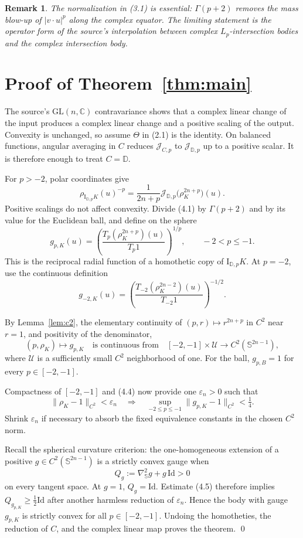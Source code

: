 \documentclass[11pt]{article}
\newtheorem{remark}[theorem]{Remark}
\newcommand{\C}{\mathbb C}
\newcommand{\D}{\mathbb D}
\newcommand{\Sph}{\mathbb S}
\newcommand{\J}{\mathcal J}
\newcommand{\Idp}{\mathrm I_{\D,p}}
\newcommand{\GL}{\mathrm{GL}}
\newcommand{\Gam}{\Gamma}
\begin{document}
\begin{remark}
The normalization in (3.1) is essential: $\Gam(p+2)$ removes the mass blow-up
of $|v\cdot u|^p$ along the complex equator.  The limiting statement is the
operator form of the source's interpolation between complex $L_p$-intersection
bodies and the complex intersection body.
\end{remark}

\section{Proof of Theorem~\ref{thm:main}}

The source's $\GL(n,\C)$ contravariance shows that a complex linear change of
the input produces a complex linear change and a positive scaling of the
output.  Convexity is unchanged, so assume $\Theta$ in (2.1) is the identity.
On balanced functions, angular averaging in $C$ reduces $\J_{C,p}$ to
$\J_{\D,p}$ up to a positive scalar.  It is therefore enough to treat $C=\D$.

For $p>-2$, polar coordinates give
\[
 \rho_{\Idp K}(u)^{-p}
 =\frac1{2n+p}\J_{\D,p}\bigl(\rho_K^{2n+p}\bigr)(u).              \tag{4.1}
\]
Positive scalings do not affect convexity.  Divide (4.1) by
$\Gam(p+2)$ and by its value for the Euclidean ball, and define on the sphere
\[
 g_{p,K}(u)=
 \left(
 \frac{T_p(\rho_K^{2n+p})(u)}{T_p1}
 \right)^{1/p},\qquad -2<p\le-1.                                  \tag{4.2}
\]
This is the reciprocal radial function of a homothetic copy of
$\Idp K$.  At $p=-2$, use the continuous definition
\[
 g_{-2,K}(u)=
 \left(\frac{T_{-2}(\rho_K^{2n-2})(u)}{T_{-2}1}\right)^{-1/2}.     \tag{4.3}
\]

By Lemma~\ref{lem:c2}, the elementary continuity of
$(p,r)\mapsto r^{2n+p}$ in $C^2$ near $r=1$, and positivity of the denominator,
\[
 (p,\rho_K)\longmapsto g_{p,K}
\quad\text{is continuous from}\quad
 [-2,-1]\times\mathcal U\longrightarrow C^2(\Sph^{2n-1}),        \tag{4.4}
\]
where $\mathcal U$ is a sufficiently small $C^2$ neighborhood of one.
For the ball, $g_{p,B}=1$ for every $p\in[-2,-1]$.

Compactness of $[-2,-1]$ and (4.4) now provide one
$\varepsilon_n>0$ such that
\[
 \|\rho_K-1\|_{C^2}<\varepsilon_n
 \quad\Longrightarrow\quad
 \sup_{-2\le p\le-1}\|g_{p,K}-1\|_{C^2}<\tfrac14.                \tag{4.5}
\]
Shrink $\varepsilon_n$ if necessary to absorb the fixed equivalence constants
in the chosen $C^2$ norm.

Recall the spherical curvature criterion: the one-homogeneous extension of a
positive $g\in C^2(\Sph^{2n-1})$ is a strictly convex gauge when
\[
 Q_g:=\nabla^2_{\Sph}g+g\,\mathrm{Id}>0                             \tag{4.6}
\]
on every tangent space.  At $g=1$, $Q_g=\mathrm{Id}$.  Estimate (4.5) therefore
implies $Q_{g_{p,K}}\ge\frac12\mathrm{Id}$ after another harmless reduction of
$\varepsilon_n$.  Hence the body with gauge $g_{p,K}$ is strictly convex for
all $p\in[-2,-1]$.  Undoing the homotheties, the reduction of $C$, and the
complex linear map proves the theorem. \qed
\end{document}
